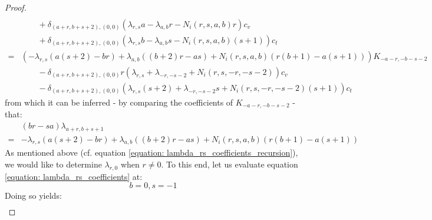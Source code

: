 \begin{proof}
\begin{equation}
\begin{aligned}
                                \\
                                & \qquad + \delta_{(a + r, b + s + 2), (0, 0)} \left( \lambda_{r, s} a - \lambda_{a, b} r - N_i(r, s, a, b) r \right) c_v
                                \\
                                & \qquad + \delta_{(a + r, b + s + 2), (0, 0)} \left( \lambda_{r, s} b - \lambda_{a, b} s - N_i(r, s, a, b) (s + 1) \right) c_t
                            \\
                            = &
                                \left( -\lambda_{r, s} \left( a(s + 2) - br \right) + \lambda_{a, b} \left( (b + 2) r - as \right) + N_i(r, s, a, b)\left( r(b + 1) - a(s + 1) \right) \right) K_{-a - r, -b - s - 2}
                                \\
                                & \qquad - \delta_{(a + r, b + s + 2), (0, 0)} r \left( \lambda_{r, s} + \lambda_{-r, -s - 2} + N_i(r, s, -r, -s - 2) \right) c_v
                                \\
                                & \qquad - \delta_{(a + r, b + s + 2), (0, 0)} \left( \lambda_{r, s} (s + 2) + \lambda_{-r, -s - 2} s + N_i(r, s, -r, -s - 2) (s + 1) \right) c_t
                        \end{aligned}
                    \end{equation}
                from which it can be inferred - by comparing the coefficients of $K_{-a - r, -b - s - 2}$ - that:
                    \begin{equation} \label{equation: lambda_rs_coefficients}
                        \begin{aligned}
                            & (br - sa) \lambda_{a + r, b + s + 1}
                            \\
                            = & -\lambda_{r, s} \left( a(s + 2) - br \right) + \lambda_{a, b} \left( (b + 2) r - as \right) + N_i(r, s, a, b)\left( r(b + 1) - a(s + 1) \right)
                        \end{aligned}
                    \end{equation}
                As mentioned above (cf. equation \eqref{equation: lambda_rs_coefficients_recursion}), we would like to determine $\lambda_{r, 0}$ when $r \not = 0$. To this end, let us evaluate equation \eqref{equation: lambda_rs_coefficients} at:
                    $$b = 0, s = -1$$
                Doing so yields:
                    $$
                        \begin{aligned}

\end{aligned}$$
\end{proof}
